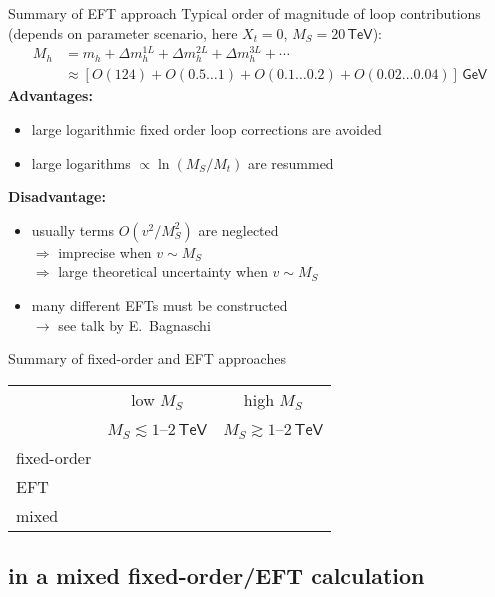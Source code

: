 \documentclass[hyperref={pdfpagelabels=false},ngerman]{beamer}
\newcommand{\cmark}{\ding{51}}%
\newcommand{\xmark}{\ding{55}}%
\newcommand{\eh}[1]{\,\mathsf{#1}}
\newcommand{\ok}{\textcolor{darkgreen}{\cmark}}
\newcommand{\notok}{\textcolor{red}{\xmark}}
\newcommand{\MS}{\ensuremath{M_S}}
\renewcommand{\emph}{\textbf}
\newcommand{\TeV}{\eh{TeV}}
\begin{document}
\begin{frame}{Summary of EFT approach}
  Typical order of magnitude of loop contributions (depends on
  parameter scenario, here $X_t = 0$, $\MS = 20\eh{TeV}$):
  \begin{align*}
    M_h &= m_h + \Delta m_h^{1L} + \Delta m_h^{2L} + \Delta m_h^{3L} + \cdots \\
    &\approx [O(124) + O(0.5\ldots 1) + O(0.1\ldots 0.2) + O(0.02\ldots 0.04)] \eh{GeV}
  \end{align*}
  \emph{Advantages:}
  \begin{itemize}
  \item large logarithmic fixed order loop corrections are avoided
  \item large logarithms $\propto\ln(M_S/M_t)$ are resummed
  \end{itemize}
  \emph{Disadvantage:}
  \begin{itemize}
  \item usually terms $O(v^2/M_S^2)$ are neglected \\
    $\Rightarrow$ imprecise when $v \sim \MS$ \\
    $\Rightarrow$ large theoretical uncertainty when $v \sim \MS$
  \item many different EFTs must be constructed \\
    $\rightarrow$ see talk by E.\ Bagnaschi
\end{itemize}
\end{frame}

\begin{frame}{Summary of fixed-order and EFT approaches}
  \begin{center}
    \begin{tabular}{lcc}
      \toprule
                  & low $\MS$ & high $\MS$ \\
                  & $\MS \lesssim 1$--$2\TeV$ & $\MS \gtrsim 1$--$2\TeV$ \\
      \midrule
      fixed-order & \ok       & \notok     \\
      EFT         & \notok    & \ok        \\
      mixed       & \ok       & \ok        \\
      \bottomrule
    \end{tabular}
  \end{center}
\end{frame}


\subsection{in a mixed fixed-order/EFT calculation}
\end{document}
